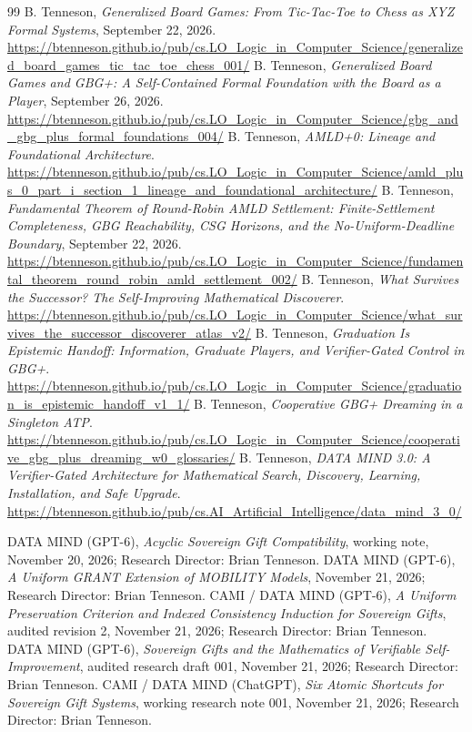 \documentclass[11pt,letterpaper]{article}
\theoremstyle{definition}\newtheorem{definition}[theorem]{Definition}\newtheorem{example}[theorem]{Example}
\theoremstyle{remark}\newtheorem{remark}[theorem]{Remark}
\begin{document}
\begin{thebibliography}{99}
 B. Tenneson, \emph{Generalized Board Games: From Tic-Tac-Toe to Chess as XYZ Formal Systems}, September 22, 2026. \url{https://btenneson.github.io/pub/cs.LO_Logic_in_Computer_Science/generalized_board_games_tic_tac_toe_chess_001/}
 B. Tenneson, \emph{Generalized Board Games and GBG+: A Self-Contained Formal Foundation with the Board as a Player}, September 26, 2026. \url{https://btenneson.github.io/pub/cs.LO_Logic_in_Computer_Science/gbg_and_gbg_plus_formal_foundations_004/}
 B. Tenneson, \emph{AMLD+0: Lineage and Foundational Architecture}. \url{https://btenneson.github.io/pub/cs.LO_Logic_in_Computer_Science/amld_plus_0_part_i_section_1_lineage_and_foundational_architecture/}
 B. Tenneson, \emph{Fundamental Theorem of Round-Robin AMLD Settlement: Finite-Settlement Completeness, GBG Reachability, CSG Horizons, and the No-Uniform-Deadline Boundary}, September 22, 2026. \url{https://btenneson.github.io/pub/cs.LO_Logic_in_Computer_Science/fundamental_theorem_round_robin_amld_settlement_002/}
 B. Tenneson, \emph{What Survives the Successor? The Self-Improving Mathematical Discoverer}. \url{https://btenneson.github.io/pub/cs.LO_Logic_in_Computer_Science/what_survives_the_successor_discoverer_atlas_v2/}
 B. Tenneson, \emph{Graduation Is Epistemic Handoff: Information, Graduate Players, and Verifier-Gated Control in GBG+}. \url{https://btenneson.github.io/pub/cs.LO_Logic_in_Computer_Science/graduation_is_epistemic_handoff_v1_1/}
 B. Tenneson, \emph{Cooperative GBG+ Dreaming in a Singleton ATP}. \url{https://btenneson.github.io/pub/cs.LO_Logic_in_Computer_Science/cooperative_gbg_plus_dreaming_w0_glossaries/}
 B. Tenneson, \emph{DATA MIND 3.0: A Verifier-Gated Architecture for Mathematical Search, Discovery, Learning, Installation, and Safe Upgrade}. \url{https://btenneson.github.io/pub/cs.AI_Artificial_Intelligence/data_mind_3_0/}

 DATA MIND (GPT-6), \emph{Acyclic Sovereign Gift Compatibility}, working note, November 20, 2026; Research Director: Brian Tenneson.
 DATA MIND (GPT-6), \emph{A Uniform GRANT Extension of MOBILITY Models}, November 21, 2026; Research Director: Brian Tenneson.
 CAMI / DATA MIND (GPT-6), \emph{A Uniform Preservation Criterion and Indexed Consistency Induction for Sovereign Gifts}, audited revision 2, November 21, 2026; Research Director: Brian Tenneson.
 DATA MIND (GPT-6), \emph{Sovereign Gifts and the Mathematics of Verifiable Self-Improvement}, audited research draft 001, November 21, 2026; Research Director: Brian Tenneson.
 CAMI / DATA MIND (ChatGPT), \emph{Six Atomic Shortcuts for Sovereign Gift Systems}, working research note 001, November 21, 2026; Research Director: Brian Tenneson.
\end{thebibliography}
\end{document}
